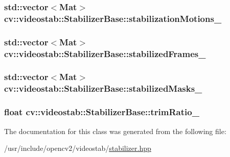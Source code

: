 \hypertarget{classcv_1_1videostab_1_1StabilizerBase_aeb86f1064652cceb6f9a1735a81da5af}{
\subsubsection[{stabilization\-Motions\-\_\-}]{\setlength{\rightskip}{0pt plus 5cm}std\-::vector$<$Mat$>$ cv\-::videostab\-::\-Stabilizer\-Base\-::stabilization\-Motions\-\_\-\hspace{0.3cm}{\ttfamily [protected]}}}\label{classcv_1_1videostab_1_1StabilizerBase_aeb86f1064652cceb6f9a1735a81da5af}
\hypertarget{classcv_1_1videostab_1_1StabilizerBase_afbf3e2dd807b19647b545585cf0dbd3e}{
\subsubsection[{stabilized\-Frames\-\_\-}]{\setlength{\rightskip}{0pt plus 5cm}std\-::vector$<$Mat$>$ cv\-::videostab\-::\-Stabilizer\-Base\-::stabilized\-Frames\-\_\-\hspace{0.3cm}{\ttfamily [protected]}}}\label{classcv_1_1videostab_1_1StabilizerBase_afbf3e2dd807b19647b545585cf0dbd3e}
\hypertarget{classcv_1_1videostab_1_1StabilizerBase_ac77d036c0a94ca9b34ae8f8c69ac220d}{
\subsubsection[{stabilized\-Masks\-\_\-}]{\setlength{\rightskip}{0pt plus 5cm}std\-::vector$<$Mat$>$ cv\-::videostab\-::\-Stabilizer\-Base\-::stabilized\-Masks\-\_\-\hspace{0.3cm}{\ttfamily [protected]}}}\label{classcv_1_1videostab_1_1StabilizerBase_ac77d036c0a94ca9b34ae8f8c69ac220d}
\hypertarget{classcv_1_1videostab_1_1StabilizerBase_acd5ad58425a94dd6af0a29b98ee5517c}{
\subsubsection[{trim\-Ratio\-\_\-}]{\setlength{\rightskip}{0pt plus 5cm}float cv\-::videostab\-::\-Stabilizer\-Base\-::trim\-Ratio\-\_\-\hspace{0.3cm}{\ttfamily [protected]}}}\label{classcv_1_1videostab_1_1StabilizerBase_acd5ad58425a94dd6af0a29b98ee5517c}


The documentation for this class was generated from the following file\-:\begin{DoxyCompactItemize}
\item 
/usr/include/opencv2/videostab/\hyperlink{stabilizer_8hpp}{stabilizer.\-hpp}\end{DoxyCompactItemize}
